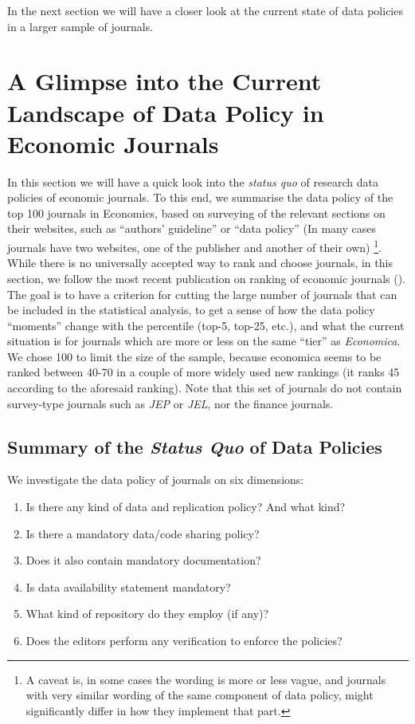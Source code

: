 \documentclass[11pt]{article}
\begin{document}
In the next section we will have a closer look at the current state of data policies in a larger sample of journals.



\newpage
\section{A Glimpse into the Current Landscape of Data Policy in Economic Journals}
\label{landscape}
In this section we will have a quick look into the \textit{status quo} of research data policies of economic journals. To this end, we summarise the data policy of the top 100 journals in Economics, based on surveying of the relevant sections on their websites, such as ``authors' guideline'' or ``data policy'' (In many cases journals have two websites, one of the publisher and another of their own) \footnote{A caveat is, in some cases the wording is more or less vague, and journals with very similar wording of the same component of data policy, might significantly differ in how they implement that part.}.\\

While there is no universally accepted way to rank and choose journals, in this section, we follow the most recent publication on ranking of economic journals (\cite{ham2021new}). The goal is to have a criterion for cutting the large number of journals that can be included in the statistical analysis, to get a sense of how the data policy ``moments'' change with the percentile (top-5, top-25, etc.), and what the current situation is for journals which are more or less on the same ``tier'' as \textit{Economica}. We chose 100 to limit the size of the sample, because economica seems to be ranked between 40-70 in a couple of more widely used new rankings (it ranks 45 according to the aforesaid ranking). Note that this set of journals do not contain survey-type journals such as \textit{JEP} or \textit{JEL}, nor the finance journals. 

\subsection{Summary of the \textit{Status Quo} of Data Policies}
We investigate the data policy of journals on six dimensions:
\begin{enumerate}
\item Is there any kind of data and replication policy? And what kind?
\item Is there a mandatory data/code sharing policy?
\item Does it also contain mandatory documentation?
\item Is data availability statement mandatory?
\item What kind of repository do they employ (if any)?
\item Does the editors perform any verification to enforce the policies?
\end{enumerate}
\end{document}
